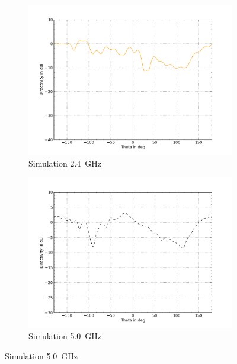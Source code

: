 \begin{figure}[h!]
	\centering
	\begin{subfigure}[b]{0.48\textwidth}
		\includegraphics[width=1\textwidth]{../fig/plt/crazy_stuff_l4_pcb_v2c_laptop_1a_105_eabs_phi90_2ghz4.png}
		\caption{Simulation \SI{2.4}{\giga\hertz}}
	\end{subfigure}
	\begin{subfigure}[b]{0.48\textwidth}
		\includegraphics[width=1\textwidth]{../fig/plt/crazy_stuff_l4_pcb_v2c_laptop_1a_105_eabs_phi90_5ghz.png}
		\caption{Simulation \SI{5.0}{\giga\hertz}}
	\end{subfigure}


\end{figure}
